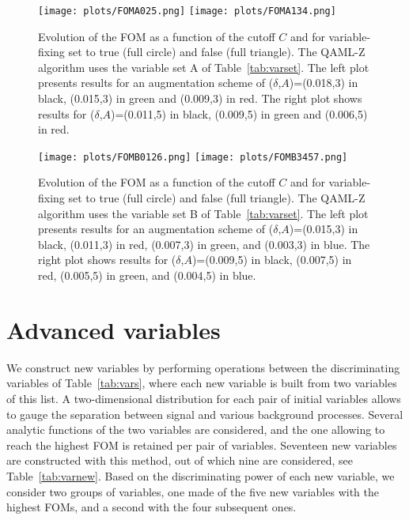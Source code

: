 \documentclass{article}
\begin{document}
\begin{figure}[!htbp]
\begin{center}
\texttt{[image: plots/FOMA025.png]}
\texttt{[image: plots/FOMA134.png]}
\end{center} 
\caption{Evolution of the FOM as a function of the cutoff $C$ and for variable-fixing
  set to true (full circle) and false (full triangle). The QAML-Z algorithm uses the variable set A
  of Table~\ref{tab:varset}. The left plot presents results for an augmentation scheme of
  ($\delta$,$A$)=(0.018,3) in black, (0.015,3) in green and (0.009,3) in red. The
  right plot shows results for ($\delta$,$A$)=(0.011,5) in black, (0.009,5) in green
  and (0.006,5) in red.}
\label{fig:fomA}
\end{figure}

\begin{figure}[!htbp]
\begin{center}
\texttt{[image: plots/FOMB0126.png]}
\texttt{[image: plots/FOMB3457.png]}
\end{center} 
\caption{Evolution of the FOM as a function of the cutoff $C$ and for variable-fixing
  set to true (full circle) and false (full triangle). The QAML-Z algorithm uses the variable set B
  of Table~\ref{tab:varset}. The left plot presents results for an augmentation scheme of
  ($\delta$,$A$)=(0.015,3) in black, (0.011,3) in red, (0.007,3) in green, and
  (0.003,3) in blue. The right plot shows results for ($\delta$,$A$)=(0.009,5)
  in black, (0.007,5) in red, (0.005,5) in green, and (0.004,5) in blue.}
\label{fig:fomB}
\end{figure}

\section{Advanced variables}
\label{s:advar}

We construct new variables by performing operations between the 
discriminating variables of Table~\ref{tab:vars}, where each new variable 
is built from two variables of this list. A two-dimensional distribution 
for each pair of initial variables allows to gauge the separation between 
signal and various background processes. Several analytic functions of the 
two variables are considered, and the one allowing to reach the highest 
FOM is retained per pair of variables. Seventeen new variables are 
constructed with this method, out of which nine are considered, see 
Table~\ref{tab:varnew}. Based on the discriminating power of each new 
variable, we consider two groups of variables, one made of the five new 
variables with the highest FOMs, and a second with the four subsequent 
ones.
\end{document}
